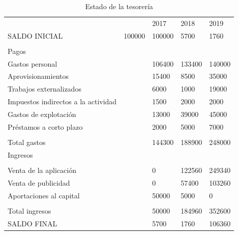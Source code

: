 \documentclass[11pt,leqno]{article}
\begin{document}
\begin{table}[H]
\centering
\caption{Estado de la tesorería}
\label{tesoreria}
\begin{tabular}{@{}lllll@{}}
                                    &        & 2017   & 2018   & 2019   \\
SALDO INICIAL                       & 100000 & 100000 & 5700   & 1760   \\
                                    &        &        &        &        \\
Pagos                               &        &        &        &        \\
Gastos personal                     &        & 106400 & 133400 & 140000 \\
Aprovisionamientos                  &        & 15400  & 8500   & 35000  \\
Trabajos externalizados             &        & 6000   & 1000   & 19000  \\
Impuestos indirectos a la actividad &        & 1500   & 2000   & 2000   \\
Gastos de explotación               &        & 13000  & 39000  & 45000  \\
Préstamos a corto plazo             &        & 2000   & 5000   & 7000   \\
                                    &        &        &        &        \\
Total gastos                        &        & 144300 & 188900 & 248000 \\
Ingresos                            &        &        &        &        \\
                                    &        &        &        &        \\
Venta de la aplicación              &        & 0      & 122560 & 249340 \\
Venta de publicidad                 &        & 0      & 57400  & 103260 \\
Aportaciones al capital             &        & 50000  & 5000   & 0      \\
                                    &        &        &        &        \\
Total ingresos                      &        & 50000  & 184960 & 352600 \\
SALDO FINAL                         &        & 5700   & 1760   & 106360
\end{tabular}
\end{table}
\end{document}
